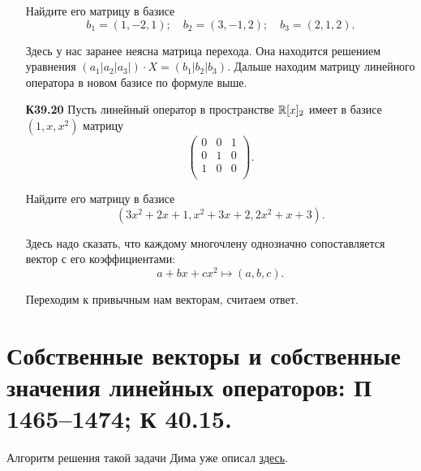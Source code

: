 \documentclass[a4paper]{article}
\begin{document}
\begin{enumerate}
        Найдите его матрицу в базисе
        \begin{equation*}
            b_1 = (1, -2, 1); \quad
            b_2 = (3, -1, 2); \quad
            b_3 = (2, 1, 2).
        \end{equation*}

        \begin{solution}
            Здесь у нас заранее неясна матрица перехода. Она находится решением уравнения $(a_1 | a_2 | a_3 |) \cdot X = (b_1 | b_2 | b_3)$. Дальше находим матрицу линейного оператора в новом базисе по формуле выше.
        \end{solution}

    \item[\textbf{К39.20}]
        Пусть линейный оператор в пространстве $\mathbb{R}[x]_2$ имеет в базисе $(1, x, x^2)$ матрицу
        \begin{equation*}
            \begin{pmatrix}
                0 & 0 & 1 \\
                0 & 1 & 0 \\
                1 & 0 & 0 \\
            \end{pmatrix}.
        \end{equation*}

        Найдите его матрицу в базисе
        \begin{equation*}
            (3x^2 + 2x + 1, x^2 + 3x + 2, 2x^2 + x + 3).
        \end{equation*}

        \begin{solution}
            Здесь надо сказать, что каждому многочлену однозначно сопоставляется вектор с его коэффициентами:
            \begin{equation*}
                a + bx + cx^2 \mapsto (a, b, c).
            \end{equation*}
            
            Переходим к привычным нам векторам, считаем ответ.
        \end{solution}
    \end{enumerate}
    
    \newpage
    \section{Собственные векторы и собственные значения линейных операторов: П 1465--1474; К 40.15.}

    Алгоритм решения такой задачи Дима уже описал \href{https://docviewer.yandex.ru/view/286099993/?*=1y%2B9IzuiXNOrJ6ZQ01NuoVUurxt7InVybCI6InlhLWRpc2stcHVibGljOi8vNVhNeGdORnVtNjBWcGRJV04vVzdCbTYzMU9POUZCYUswWktLSWxGVk85aG96dCt3Zlg4Q2pOcCs0NWpHMnh4Q3EvSjZicG1SeU9Kb25UM1ZvWG5EYWc9PTovU2VtaW5hcjI5X2FsZ29yaXRobXMucGRmIiwidGl0bGUiOiJTZW1pbmFyMjlfYWxnb3JpdGhtcy5wZGYiLCJub2lmcmFtZSI6ZmFsc2UsInVpZCI6IjI4NjA5OTk5MyIsInRzIjoxNTkxNzQwMTg3OTA0LCJ5dSI6IjU0Mjk1MDEzNDE1NjU1MjYzNjIifQ%3D%3D}{здесь}.
\end{document}
